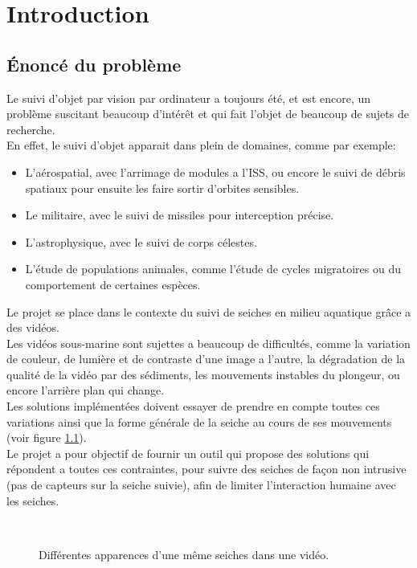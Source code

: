 \chapter{Introduction}





\section{Énoncé du problème}
Le suivi d'objet par vision par ordinateur a toujours été, et est encore, un problème suscitant beaucoup d'intérêt et qui fait l'objet de beaucoup de sujets de recherche.\\
En effet, le suivi d'objet apparait dans plein de domaines, comme par exemple:
\begin{itemize}
	\item L'aérospatial, avec l'arrimage de modules a l'ISS, ou encore le suivi de débris spatiaux pour ensuite les faire sortir d'orbites sensibles.
	\item Le militaire, avec le suivi de missiles pour interception précise.
	\item L'astrophysique, avec le suivi de corps célestes.
	\item L'étude de populations animales, comme l'étude de cycles migratoires ou du comportement de certaines espèces.\\
\end{itemize}

Le projet se place dans le contexte du suivi de seiches en milieu aquatique grâce a des vidéos.\\
Les vidéos sous-marine sont sujettes a beaucoup de difficultés, comme la variation de couleur, de lumière et de contraste d'une image a l'autre, la dégradation de la qualité de la vidéo par des sédiments, les mouvements instables du plongeur, ou encore l'arrière plan qui change.\\
Les solutions implémentées doivent essayer de prendre en compte toutes ces variations ainsi que la forme générale de la seiche au cours de ses mouvements (voir figure \ref{fig:cuttlefish_variation}).\\
Le projet a pour objectif de fournir un outil qui propose des solutions qui répondent a toutes ces contraintes, pour suivre des seiches de façon non intrusive (pas de capteurs sur la seiche suivie), afin de limiter l'interaction humaine avec les seiches.

\begin{figure}[!htbp]
\center
	\hspace{0.5cm}
	\\
	\hspace{0.5cm}
\caption{Différentes apparences d'une même seiches dans une vidéo.}
\label{fig:cuttlefish_variation}
\end{figure}
\FloatBarrier
\clearpage





